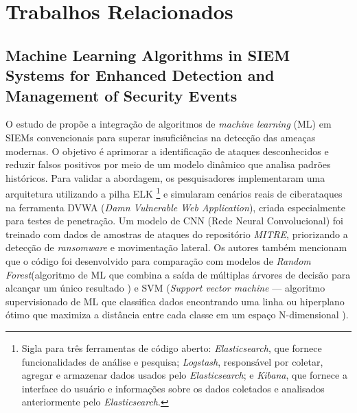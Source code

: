 \chapter{Trabalhos Relacionados}
\label{cap:trabalhos:relacionados}


\section{Machine Learning Algorithms in SIEM Systems for Enhanced Detection and Management of Security Events}

O estudo de  propõe a integração de algoritmos de \textit{machine learning} (ML) em SIEMs convencionais para superar insuficiências na detecção das ameaças modernas. 
O objetivo é aprimorar a identificação de ataques desconhecidos e reduzir falsos positivos por meio de um modelo dinâmico que analisa padrões históricos. 
Para validar a abordagem, os pesquisadores implementaram uma arquitetura utilizando a pilha ELK 
\footnote{Sigla para três ferramentas de código aberto: \textit{Elasticsearch}, que fornece funcionalidades de análise e pesquisa; \textit{Logstash}, responsável por coletar, agregar e armazenar dados usados pelo \textit{Elasticsearch}; e \textit{Kibana}, que fornece a interface do usuário e informações sobre os dados coletados e analisados anteriormente pelo \textit{Elasticsearch}.} 
e simularam cenários reais de ciberataques na ferramenta DVWA (\textit{Damn Vulnerable Web Application}), criada especialmente para testes de penetração. 
Um modelo de CNN (Rede Neural Convolucional) foi treinado com dados de amostras de ataques do repositório \textit{MITRE}, priorizando a detecção de \textit{ransomware} e movimentação lateral. 
Os autores também mencionam que o código foi desenvolvido para comparação com modelos de \textit{Random Forest}(algoritmo de ML que combina a saída de múltiplas árvores de decisão para alcançar um único resultado \cite{IBM_RandomForest}) 
e SVM (\textit{Support vector machine} --- algoritmo supervisionado de ML que classifica dados encontrando uma linha ou hiperplano ótimo que maximiza a distância entre cada classe em um espaço N-dimensional \cite{IBM_SVM}).




